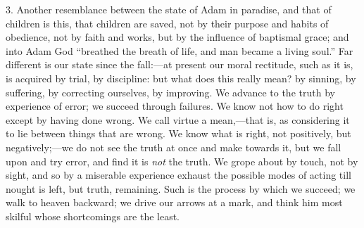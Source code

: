 3. Another resemblance between the state of Adam in paradise, and
that of children is this, that children are saved, not by their
purpose and habits of obedience, not by faith and works, but by the
influence of baptismal grace; and into Adam God ``breathed the
breath of life, and man became a living soul.'' Far different is
our state since the fall:—at present our moral rectitude, such as it
is, is acquired by trial, by discipline: but what does this really
mean? by sinning, by suffering, by correcting ourselves, by improving.
We advance to the truth by experience of error; we succeed through
failures. We know not how to do right except by having done wrong. We
call virtue a mean,—that is, as considering it to lie between things
that are wrong. We know what is right, not positively, but negatively;—we
do not see the truth at once and make towards it, but we fall upon and
try error, and find it is \emph{not} the truth. We grope about by
touch, not by sight, and so by a miserable experience exhaust the
possible modes of acting till nought is left, but truth, remaining.
Such is the process by which we succeed; we walk to heaven backward;
we drive our arrows at a mark, and think him most skilful whose
shortcomings are the least.

